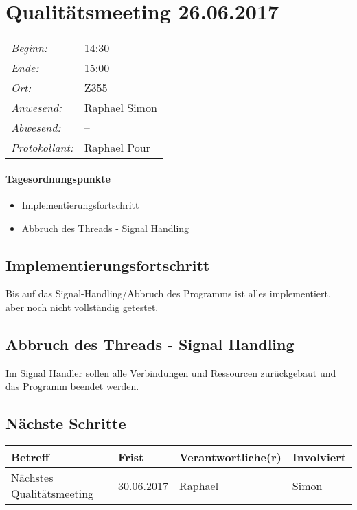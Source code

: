 \documentclass{scrartcl}
\date{26.06.2017}	%
\begin{document}
\maketitle
\section{Qualitätsmeeting 26.06.2017}	%
\begin{tabular}[t]{p{.25\linewidth} p{.25\linewidth}}
\emph{Beginn:}				& 14:30\\
\emph{Ende:}					& 15:00\\
\emph{Ort:}						& Z355\\
\emph{Anwesend:}	& 
Raphael\newline
Simon
\\
\emph{Abwesend:}		 & 
--
\\
\emph{Protokollant:}& Raphael Pour
\end{tabular}
\paragraph{Tagesordnungspunkte}
\begin{itemize}
\item Implementierungsfortschritt
\item Abbruch des Threads - Signal Handling
\end{itemize}

\subsection{Implementierungsfortschritt}
Bis auf das Signal-Handling/Abbruch des Programms ist alles implementiert, aber noch nicht vollständig getestet.

\subsection{Abbruch des Threads - Signal Handling}
Im Signal Handler sollen alle Verbindungen und Ressourcen zurückgebaut und das Programm beendet werden.

\subsection{Nächste Schritte}
\begin{tabular}{L{.249} L{.2} L{.25} L{.25}}
Betreff & Frist & Verantwortliche(r) & Involviert\\\hline
Nächstes Qualitätsmeeting&30.06.2017&Raphael&Simon\\
\end{tabular}
\end{document}
